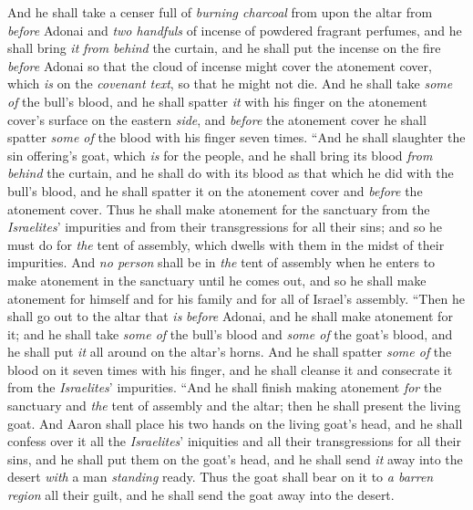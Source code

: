 \begin{biblechapter}
\verse And he shall take a censer full of \textit{burning charcoal} from upon the altar from \textit{before} Adonai and \textit{two handfuls} of incense of powdered fragrant perfumes, and he shall bring \textit{it} \textit{from behind} the curtain,
\verse and he shall put the incense on the fire \textit{before} Adonai so that the cloud of incense might cover the atonement cover, which \textit{is} on the \textit{covenant text}, so that he might not die.
\verse And he shall take \textit{some of} the bull’s blood, and he shall spatter \textit{it} with his finger on the atonement cover’s surface on the eastern \textit{side}, and \textit{before} the atonement cover he shall spatter \textit{some of} the blood with his finger seven times.
\verse “And he shall slaughter the sin offering’s goat, which \textit{is} for the people, and he shall bring its blood \textit{from behind} the curtain, and he shall do with its blood as that which he did with the bull’s blood, and he shall spatter it on the atonement cover and \textit{before} the atonement cover.
\verse Thus he shall make atonement for the sanctuary from the \textit{Israelites}’ impurities and from their transgressions for all their sins; and so he must do for \textit{the} tent of assembly, which dwells with them in the midst of their impurities.
\verse And \textit{no person} shall be in \textit{the} tent of assembly when he enters to make atonement in the sanctuary until he comes out, and so he shall make atonement for himself and for his family and for all of Israel’s assembly.
\verse “Then he shall go out to the altar that \textit{is} \textit{before} Adonai, and he shall make atonement for it; and he shall take \textit{some of} the bull’s blood and \textit{some of} the goat’s blood, and he shall put \textit{it} all around on the altar’s horns.
\verse And he shall spatter \textit{some of} the blood on it seven times with his finger, and he shall cleanse it and consecrate it from the \textit{Israelites}’ impurities.
\verse “And he shall finish making atonement \textit{for} the sanctuary and \textit{the} tent of assembly and the altar; then he shall present the living goat.
\verse And Aaron shall place his two hands on the living goat’s head, and he shall confess over it all the \textit{Israelites}’ iniquities and all their transgressions for all their sins, and he shall put them on the goat’s head, and he shall send \textit{it} away into the desert \textit{with} a man \textit{standing} ready.
\verse Thus the goat shall bear on it to \textit{a barren region} all their guilt, and he shall send the goat away into the desert.

\end{biblechapter}

